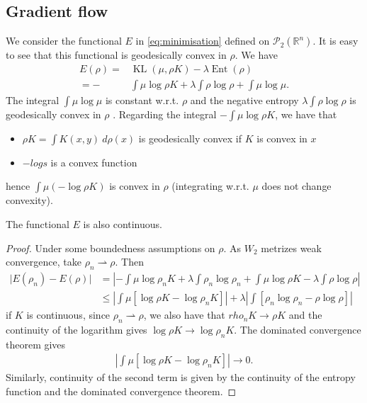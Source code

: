 \documentclass[a4paper]{article}
\DeclareMathOperator{\KL}{KL}
\DeclareMathOperator{\ent}{Ent}
\def\real{\mathbb{R}}
\begin{document}
\subsection{Gradient flow} 

We consider the functional $E$ in \eqref{eq:minimisation} defined on $\mathcal{P}_2(\real^n)$.
It is easy to see that this functional is geodesically convex in $\rho$.
We have
\begin{align*}
E(\rho)= & \KL(\mu,\rho K)-\lambda\ent(\rho)\\
=- & \int\mu\log\rho K+\lambda\int\rho\log\rho+\int\mu\log\mu.
\end{align*}
The integral $\int\mu\log\mu$ is constant w.r.t. $\rho$ and the negative entropy $\lambda\int\rho\log\rho$ is geodesically convex in $\rho$ \citep[page 130]{santambrogio2017euclidean}.
Regarding the integral $- \int\mu\log\rho K$, we have that
\begin{itemize}
\item $\rho K = \int K(x, y) \ d\rho(x)$ is geodesically convex if $K$ is convex in $x$ \citep[page 128]{santambrogio2017euclidean}
\item $-log s$ is a convex function
\end{itemize}
hence $\int\mu\left( -\log\rho K\right)$ is convex in $\rho$ (integrating w.r.t. $\mu$ does not change convexity).

The functional $E$ is also continuous.
\begin{proof}
Under some boundedness assumptions on $\rho$.
As $W_2$ metrizes weak convergence, take $\rho_n \rightharpoonup \rho$. Then
\begin{align*}
\vert E(\rho_n) - E(\rho)\vert &= \left\lvert -\int\mu\log\rho_n K+\lambda\int\rho_n\log\rho_n +\int\mu\log\rho K-\lambda\int\rho\log\rho\right\rvert\\
&\leq  \left\lvert \int\mu\left[\log\rho K - \log\rho_n K \right]\right\rvert +\lambda\left\lvert\int\left[ \rho_n\log\rho_n -\rho\log\rho\right]\right\rvert
\end{align*}
if $K$ is continuous, since $\rho_n \rightharpoonup \rho$, we also have that $rho_n K \rightarrow \rho K$ and the continuity of the logarithm gives $\log\rho K \rightarrow\log\rho_n K$. The dominated convergence theorem gives
\begin{align*}
\left\lvert \int\mu\left[\log\rho K - \log\rho_n K \right]\right\rvert \rightarrow 0.
\end{align*}
Similarly, continuity of the second term is given by the continuity of the entropy function and the dominated convergence theorem.
\end{proof}
\end{document}
